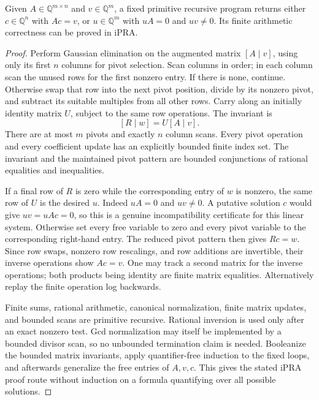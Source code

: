 \begin{lemma}
\label{lem:bounded-linear-solver}
Given $A\in\mathbb Q^{m\times n}$ and $v\in\mathbb Q^m$, a fixed
primitive recursive program returns either $c\in\mathbb Q^n$ with
$Ac=v$, or $u\in\mathbb Q^m$ with $uA=0$ and $uv\ne0$.
Its finite arithmetic correctness can be proved in iPRA.
\end{lemma}

\begin{proof}
Perform Gaussian elimination on the augmented matrix $[A\mid v]$, using
only its first $n$ columns for pivot selection. Scan columns in order; in
each column scan the unused rows for the first nonzero entry. If there is
none, continue. Otherwise swap that row into the next pivot position,
divide by its nonzero pivot, and subtract its suitable multiples from all
other rows. Carry along an initially identity matrix $U$, subject to the
same row operations. The invariant is
\[
             [R\mid w]=U[A\mid v].
\]
There are at most $m$ pivots and exactly $n$ column scans. Every pivot
operation and every coefficient update has an explicitly bounded finite
index set. The invariant and the maintained pivot pattern are bounded
conjunctions of rational equalities and inequalities.

If a final row of $R$ is zero while the corresponding entry of $w$ is
nonzero, the same row of $U$ is the desired $u$. Indeed $uA=0$ and
$uv\ne0$. A putative solution $c$ would give $uv=uAc=0$, so this is
a genuine incompatibility certificate for this linear system.
Otherwise set every free variable to zero and every pivot variable to
the corresponding right-hand entry. The reduced pivot pattern then gives
$Rc=w$. Since row swaps, nonzero row rescalings, and row additions are
invertible, their inverse operations show $Ac=v$. One may track a second
matrix for the inverse operations; both products being identity are finite
matrix equalities. Alternatively replay the finite operation log backwards.

Finite sums, rational arithmetic, canonical normalization, finite matrix
updates, and bounded scans are primitive recursive. Rational inversion is
used only after an exact nonzero test. Gcd normalization may itself be
implemented by a bounded divisor scan, so no unbounded termination claim
is needed. Booleanize the bounded matrix invariants, apply quantifier-free
induction to the fixed loops, and afterwards generalize the free entries
of $A,v,c$. This gives the stated iPRA proof route without induction on a
formula quantifying over all possible solutions.
\end{proof}

